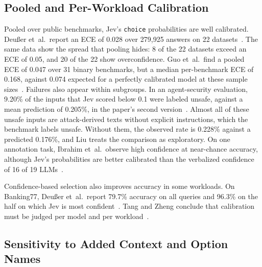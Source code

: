 \subsection{Pooled and Per-Workload Calibration}

Pooled over public benchmarks, Jev's \texttt{choice} probabilities are well calibrated. Deu{\ss}er et~al.\ report an ECE of 0.028 over 279{,}925 answers on 22 datasets~\cite{deusser2026evaluating}. The same data show the spread that pooling hides: 8 of the 22 datasets exceed an ECE of 0.05, and 20 of the 22 show overconfidence. Guo et~al.\ find a pooled ECE of 0.047 over 31 binary benchmarks, but a median per-benchmark ECE of 0.168, against 0.074 expected for a perfectly calibrated model at these sample sizes~\cite{guo2026just}. Failures also appear within subgroups. In an agent-security evaluation, 9.20\% of the inputs that Jev scored below 0.1 were labeled unsafe, against a mean prediction of 0.205\%, in the paper's second version~\cite{liu2026evaluating}. Almost all of these unsafe inputs are attack-derived texts without explicit instructions, which the benchmark labels unsafe. Without them, the observed rate is 0.228\% against a predicted 0.176\%, and Liu treats the comparison as exploratory. On one annotation task, Ibrahim et~al.\ observe high confidence at near-chance accuracy, although Jev's probabilities are better calibrated than the verbalized confidence of 16 of 19 LLMs~\cite{ibrahim2026evaluating}.

Confidence-based selection also improves accuracy in some workloads. On Banking77, Deu{\ss}er et~al.\ report 79.7\% accuracy on all queries and 96.3\% on the half on which Jev is most confident~\cite{deusser2026evaluating}. Tang and Zheng conclude that calibration must be judged per model and per workload~\cite{tang2026typed}.

\subsection{Sensitivity to Added Context and Option Names}

